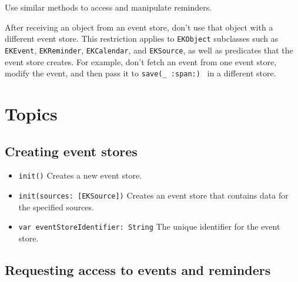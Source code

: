 \documentclass{article}
\begin{document}
Use similar methods to access and manipulate reminders.

After receiving an object from an event store, don't use that object with a different event store. This restriction applies to \texttt{EKObject} subclasses such as \texttt{EKEvent}, \texttt{EKReminder}, \texttt{EKCalendar}, and \texttt{EKSource}, as well as predicates that the event store creates. For example, don't fetch an event from one event store, modify the event, and then pass it to \texttt{save(\_ :span:) } in a different store.

\section*{Topics}

\subsection*{Creating event stores}

\begin{itemize}
    \item \texttt{init()}
    Creates a new event store.

    \item \texttt{init(sources: [EKSource])}
    Creates an event store that contains data for the specified sources.

    \item \texttt{var eventStoreIdentifier: String}
    The unique identifier for the event store.
\end{itemize}

\subsection*{Requesting access to events and reminders}
\end{document}
